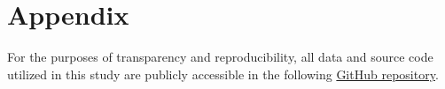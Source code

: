 \section*{Appendix}


\noindent For the purposes of transparency and reproducibility, all data and source code utilized in this study are publicly accessible in the following \href{https://github.com/yildirimalper/yildirim-masters-thesis}{GitHub repository}. \\









